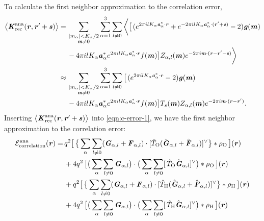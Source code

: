 \documentclass[aps,pre,preprint,unsortedaddress]{revtex4}
\renewcommand{\v}[1]{\textbf{\textit{#1}}}
\begin{document}
To calculate the first neighbor approximation to the correlation error, 
\begin{align}\nonumber
  \big\langle
  \v K^{\textrm{ana}}_{\textrm{rec}}(\v r, \v r' + \v s)
  \big\rangle
  =\,&
  \sum_{
    \begin{subarray}{c}
      \vert m_{\alpha}\vert < K_\alpha/2\\
      \v m\neq 0
    \end{subarray}}
  \sum_{\alpha=1}^3\sum_{l\neq 0}
  \bigg\langle
  \big[
  \,(
  e^{2\pi i l K_\alpha\v a^\ast_\alpha\cdot \v r} +
  e^{-2\pi i l K_\alpha\v a^\ast_\alpha\cdot (\v r' + \v s)}
  - 2
  )
  \v g(\v m)
  \\\nonumber
  \,&
  - 4\pi i l K_\alpha\v a_\alpha^\ast e^{2\pi i l K_\alpha\v a^\ast_\alpha\cdot \v r}
  f(\v m)
  \big]
  Z_{\alpha,l}(\v m)
  e^{-2\pi i\v m\cdot(\v r-\v r' - \v s)}
  \bigg\rangle \\\nonumber
  \approx\,&
  \sum_{
    \begin{subarray}{c}
      \vert m_{\alpha}\vert < K_\alpha/2\\
      \v m\neq 0
    \end{subarray}}
  \sum_{\alpha=1}^3\sum_{l\neq 0}
  \big[
  \,(
  e^{2\pi i l K_\alpha\v a^\ast_\alpha\cdot \v r} 
  - 2
  )
  \v g(\v m)
  \\
  \,&
  - 4\pi i l K_\alpha\v a_\alpha^\ast e^{2\pi i l K_\alpha\v a^\ast_\alpha\cdot \v r}
  f(\v m)
  \big] T_s(\v m)
  Z_{\alpha,l}(\v m)
  e^{-2\pi i\v m\cdot(\v r-\v r')}.
\end{align}
Inserting
$\big\langle
\v K^{\textrm{ana}}_{\textrm{rec}}(\v r, \v r' + \v s)
\big\rangle$
into \eqref{eqn:c-error-1}, we have the first neighbor approximation to the
correlation error:
\begin{align}\nonumber
  \mathcal E^{\textrm{ana}}_{\textrm{correlation}}(\v r)
  =\,&
  q^2
  \big[\,
  \big\{
  \sum_{\alpha} \sum_{l\neq 0}
  (\v G_{\alpha,l}+\v F_{\alpha,l})\cdot
  [\hat T_{\textrm{O}} (\hat{\v G}_{\alpha,l}+\hat{\v F}_{\alpha,l})]^{\vee}
  \big\}
  \ast \rho_{\textrm{O}}
  \,\big] (\v r) \\\nonumber
  \,&+
  4q^2\,
  \big[
  \big(
  \sum_{\alpha} \sum_{l\neq 0}  
  \v G_{\alpha,l}
  \big)
  \cdot
  \big(
  \sum_{\alpha} \sum_{l\neq 0}  
  [\,\hat T_{\textrm{O}}\hat{\v G}_{\alpha,l}]^{\vee}
  \big)
  \ast \rho_{\textrm{O}}\,
  \big] (\v r) \\\nonumber
  \,&+
  q^2
  \big[\,
  \big\{
  \sum_{\alpha} \sum_{l\neq 0}
  (\v G_{\alpha,l}+\v F_{\alpha,l})\cdot
  [\hat T_{\textrm{H}} (\hat{\v G}_{\alpha,l}+\hat{\v F}_{\alpha,l})]^{\vee}
  \big\}
  \ast \rho_{\textrm{H}}
  \,\big] (\v r) \\
  \,&+
  4q^2\,
  \big[
  \big(
  \sum_{\alpha} \sum_{l\neq 0}  
  \v G_{\alpha,l}
  \big)
  \cdot
  \big(
  \sum_{\alpha} \sum_{l\neq 0}  
  [\,\hat T_{\textrm{H}}\hat{\v G}_{\alpha,l}]^{\vee}
  \big)
  \ast \rho_{\textrm{H}}\,
  \big] (\v r) 
\end{align}




{}

\end{document}
